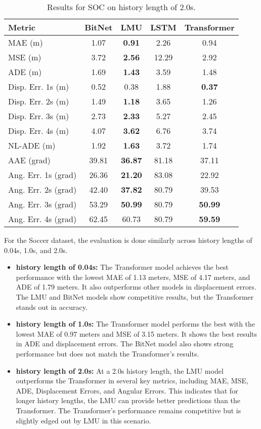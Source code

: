 \begin{table}[H]
\centering
\caption{Results for SOC on history length of 2.0s.}
\label{hist:SOC_2.0s}
\begin{tabular}{l||c|c|c|c}
Metric & BitNet & LMU & LSTM & Transformer \\
\hline \hline
MAE (m) & 1.07 & \textbf{0.91} & 2.26 & 0.94 \\
MSE (m) & 3.72 & \textbf{2.56} & 12.29 & 2.92 \\
ADE (m) & 1.69 & \textbf{1.43} & 3.59 & 1.48 \\
Disp. Err. 1s (m) & 0.52 & 0.38 & 1.88 & \textbf{0.37} \\
Disp. Err. 2s (m) & 1.49 & \textbf{1.18} & 3.65 & 1.26 \\
Disp. Err. 3s (m) & 2.73 & \textbf{2.33} & 5.27 & 2.45 \\
Disp. Err. 4s (m) & 4.07 & \textbf{3.62} & 6.76 & 3.74 \\
NL-ADE (m) & 1.92 & \textbf{1.63} & 3.72 & 1.74 \\
AAE (grad) & 39.81 & \textbf{36.87} & 81.18 & 37.11 \\
Ang. Err. 1s (grad) & 26.36 & \textbf{21.20} & 83.08 & 22.92 \\
Ang. Err. 2s (grad) & 42.40 & \textbf{37.82} & 80.79 & 39.53 \\
Ang. Err. 3s (grad) & 53.29 & \textbf{50.99} & 80.79 & \textbf{50.99} \\
Ang. Err. 4s (grad) & 62.45 & 60.73 & 80.79 & \textbf{59.59} \\
\end{tabular}
\end{table}

For the Soccer dataset, the evaluation is done similarly across history lengths of 0.04s, 1.0s, and 2.0s.

\begin{itemize}
    \item \textbf{history length of 0.04s:} The Transformer model achieves the best performance with the lowest MAE of 1.13 meters, MSE of 4.17 meters, and ADE of 1.79 meters. It also outperforms other models in displacement errors. The LMU and BitNet models show competitive results, but the Transformer stands out in accuracy.
    \item \textbf{history length of 1.0s:} The Transformer model performs the best with the lowest MAE of 0.97 meters and MSE of 3.15 meters. It shows the best results in ADE and displacement errors. The BitNet model also shows strong performance but does not match the Transformer’s results.
    \item \textbf{history length of 2.0s:} At a 2.0s history length, the LMU model outperforms the Transformer in several key metrics, including MAE, MSE, ADE, Displacement Errors, and Angular Errors. This indicates that for longer history lengths, the LMU can provide better predictions than the Transformer. The Transformer’s performance remains competitive but is slightly edged out by LMU in this scenario.
\end{itemize}

